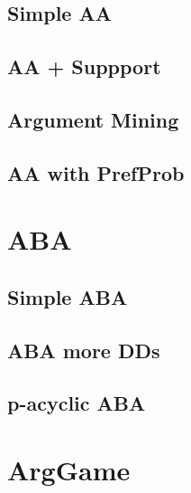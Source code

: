 \subsection{Simple AA}
\subsection{AA + Suppport}
\subsection{Argument Mining}
\subsection{AA with PrefProb}
\section{ABA}
\subsection{Simple ABA}

\subsection{ABA more DDs}
\subsection{p-acyclic ABA}
\section{ArgGame}

